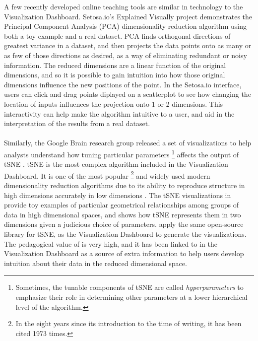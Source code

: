 \documentclass{sigchi}
\begin{document}
%
A few recently developed online teaching tools are similar in technology to the Visualization Dashboard. %
%
Setosa.io's Explained Visually \cite{setosaPCA} project demonstrates the Principal Component Analysis (PCA) dimensionality reduction algorithm \cite{jolliffe2002principal} using both a toy example and a real dataset. %
%
PCA finds orthogonal directions of greatest variance in a dataset, and then projects the data points onto as many or as few of those directions as desired, as a way of eliminating redundant or noisy information. %
%
The reduced dimensions are a linear function of the original dimensions, and so it is possible to gain intuition into how those original dimensions influence the new positions of the point.
%
In the Setosa.io interface, users can click and drag points diplayed on a scatterplot to see how changing the location of inputs influences the projection onto 1 or 2 dimensions. %
%
This interactivity can help make the algorithm intuitive to a user, and aid in the interpretation of the results from a real dataset. %
%
\\\\
%
Similarly, the Google Brain research group released a set of visualizations \cite{wattenberg2016how} to help analysts understand how tuning particular parameters%
%
\footnote{Sometimes, the tunable components of tSNE are called \textit{hyperparameters} to emphasize their role in determining other parameters at a lower hierarchical level of the algorithm.} affects the output of tSNE \cite{maaten2008visualizing}. %
%
tSNE is the most complex algorithm included in the Visualization Dashboard. %
%
It is one of the most popular%
%
\footnote{In the eight years since its introduction to the time of writing, it has been cited 1973 times.} %
%
and widely used modern dimensionality reduction algorithms due to its ability to reproduce structure in high dimensions accurately in low dimensions \cite{maaten2008visualizing}. %
%
The tSNE visualizations in \cite{wattenberg2016how} provide toy examples of particular geometrical relationships among groups of data in high dimensional spaces, and shows how tSNE represents them in two dimensions given a judicious choice of parameters. %
%
\cite{wattenberg2016how} apply the same open-source library for tSNE, \cite{wattenberg2016how} as the Visualization Dashboard to generate the visualizations. %
%
The pedagogical value of \cite{wattenberg2016how} is very high, and it has been linked to in the Visualization Dashboard as a source of extra information to help users develop intuition about their data in the reduced dimensional space.%
\end{document}
